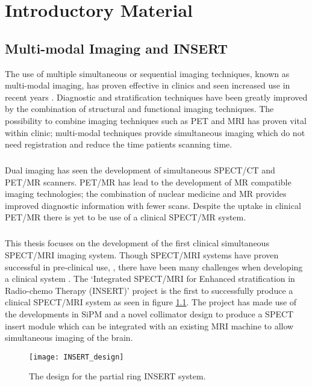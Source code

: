 \chapter{Introductory Material}
\label{chapterlabel1}

\section{Multi-modal Imaging and INSERT}
The use of multiple simultaneous or sequential imaging techniques, known as multi-modal imaging, has proven effective in clinics and seen increased use in recent years \cite{PATTON2009247}. Diagnostic and stratification techniques have been greatly improved by the combination of structural and functional imaging techniques. The possibility to combine imaging techniques such as \acrshort{PET} and \acrshort{MRI} has proven vital within clinic; multi-modal techniques provide simultaneous imaging which do not need registration and reduce the time patients scanning time. 
\paragraph{}
Dual imaging has seen the development of simultaneous \acrshort{SPECT/CT} and \acrshort{PET/MR} scanners. \acrshort{PET/MR} has lead to the development of \acrshort{MR} compatible imaging technologies; the combination of nuclear medicine and \acrshort{MR} provides improved diagnostic information with fewer scans. Despite the uptake in clinical  \acrshort{PET/MR} there is yet to be use of a clinical \acrshort{SPECT/MR} system. 
\paragraph{}
This thesis focuses on the development of the first clinical simultaneous SPECT/MRI imaging system. Though SPECT/MRI systems have proven successful in pre-clinical use, \cite{0031-9155-55-6-002}, there have been many challenges when developing a clinical system \cite{doi:10.1259/bjr.20160690}. The `Integrated SPECT/MRI for Enhanced stratification in Radio-chemo Therapy (INSERT)' project is the first to successfully produce a clinical SPECT/MRI system as seen in figure \ref{fig:INSERT}. The project has made use of the developments in SiPM and a novel collimator design \cite{7430864} to produce a SPECT insert module which can be integrated with an existing MRI machine to allow simultaneous imaging of the brain. 

\begin{figure}[htp]
    \centering
    \texttt{[image: INSERT\_design]} %
    \caption{The design for the partial ring INSERT system.} \label{fig:INSERT}
\end{figure}

